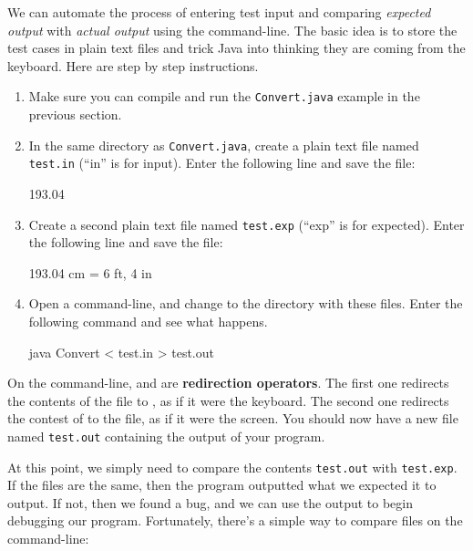 We can automate the process of entering test input and comparing {\em expected output} with {\em actual output} using the command-line.
The basic idea is to store the test cases in plain text files and trick Java into thinking they are coming from the keyboard.
Here are step by step instructions.

\begin{enumerate}

\item Make sure you can compile and run the {\tt Convert.java} example in the previous section.

\item In the same directory as {\tt Convert.java}, create a plain text file named {\tt test.in} (``in'' is for input).
Enter the following line and save the file:

\begin{stdout}
193.04
\end{stdout}

\item Create a second plain text file named {\tt test.exp} (``exp'' is for expected).
Enter the following line and save the file:

\begin{stdout}
193.04 cm = 6 ft, 4 in
\end{stdout}

\item Open a command-line, and change to the directory with these files.
Enter the following command and see what happens.

\begin{stdout}
java Convert < test.in > test.out
\end{stdout}

\end{enumerate}

On the command-line, \java{<} and \java{>} are {\bf redirection operators}.
The first one redirects the contents of the file to , as if it were the keyboard.
The second one redirects the contest of  to the file, as if it were the screen.
You should now have a new file named {\tt test.out} containing the output of your program.

At this point, we simply need to compare the contents {\tt test.out} with {\tt test.exp}.
If the files are the same, then the program outputted what we expected it to output.
If not, then we found a bug, and we can use the output to begin debugging our program.
Fortunately, there's a simple way to compare files on the command-line:

